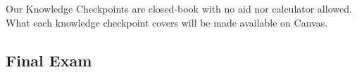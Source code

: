 \documentclass[12pt]{article}
\begin{document}
        Our Knowledge Checkpoints are closed-book with no aid nor calculator allowed. What each knowledge checkpoint covers will be made available on Canvas. %
        
        
        
        
        
        
        \subsection{Final Exam}
        
\end{document}
